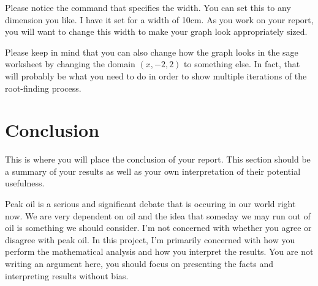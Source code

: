 \documentclass[11pt]{article}
\begin{document}
\begin{report}
Please notice the command that specifies the width. You can set this to any dimension you like. I have it set for a width of 10cm. As you work on your report, you will want to change this width to make your graph look appropriately sized.

Please keep in mind that you can also change how the graph looks in the sage worksheet by changing the domain $(x,-2,2)$ to something else. In fact, that will probably be what you need to do in order to show multiple iterations of the root-finding process.

\section{Conclusion}
This is where you will place the conclusion of your report. This section should be a summary of your results as well as your own interpretation of their potential usefulness.

Peak oil is a serious and significant debate that is occuring in our world right now. We are very dependent on oil and the idea that someday we may run out of oil is something we should consider. I'm not concerned with whether you agree or disagree with peak oil. In this project, I'm primarily concerned with how you perform the mathematical analysis and how you interpret the results. You are not writing an argument here, you should focus on presenting the facts and interpreting results without bias.

\end{report}
\end{document}
